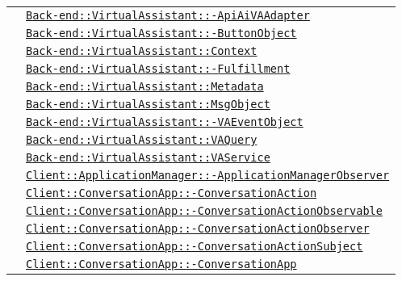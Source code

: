 \begin{longtable}{|>{\centering}m{3cm}|m{10cm}<{\centering}|}
& \hyperref[Back-end::VirtualAssistant::ApiAiVAAdapter]{\texttt{Back-end::VirtualAssistant::-\linebreak ApiAiVAAdapter}}\\
& \hyperref[Back-end::VirtualAssistant::ButtonObject]{\texttt{Back-end::VirtualAssistant::-\linebreak ButtonObject}}\\
& \hyperref[Back-end::VirtualAssistant::Context]{\texttt{Back-end::VirtualAssistant::Context}}\\
& \hyperref[Back-end::VirtualAssistant::Fulfillment]{\texttt{Back-end::VirtualAssistant::-\linebreak Fulfillment}}\\
& \hyperref[Back-end::VirtualAssistant::Metadata]{\texttt{Back-end::VirtualAssistant::Metadata}}\\
& \hyperref[Back-end::VirtualAssistant::MsgObject]{\texttt{Back-end::VirtualAssistant::MsgObject}}\\
& \hyperref[Back-end::VirtualAssistant::VAEventObject]{\texttt{Back-end::VirtualAssistant::-\linebreak VAEventObject}}\\
& \hyperref[Back-end::VirtualAssistant::VAQuery]{\texttt{Back-end::VirtualAssistant::VAQuery}}\\
& \hyperref[Back-end::VirtualAssistant::VAService]{\texttt{Back-end::VirtualAssistant::VAService}}\\
& \hyperref[Client::ApplicationManager::ApplicationManagerObserver]{\texttt{Client::ApplicationManager::-\linebreak ApplicationManagerObserver}}\\
& \hyperref[Client::ConversationApp::ConversationAction]{\texttt{Client::ConversationApp::-\linebreak ConversationAction}}\\
& \hyperref[Client::ConversationApp::ConversationActionObservable]{\texttt{Client::ConversationApp::-\linebreak ConversationActionObservable}}\\
& \hyperref[Client::ConversationApp::ConversationActionObserver]{\texttt{Client::ConversationApp::-\linebreak ConversationActionObserver}}\\
& \hyperref[Client::ConversationApp::ConversationActionSubject]{\texttt{Client::ConversationApp::-\linebreak ConversationActionSubject}}\\
& \hyperref[Client::ConversationApp::ConversationApp]{\texttt{Client::ConversationApp::-\linebreak ConversationApp}}\\

\end{longtable}
